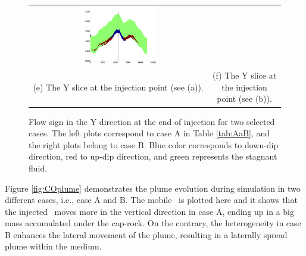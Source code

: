 \begin{figure}
\begin{tabular}{cc}
\includegraphics[width=0.45\textwidth]{./figurer/C03211_FlowSign_slcy}
\\(e) The Y slice at the injection point (see (a)).&
(f) The Y slice at the injection point (see (b)).
\end{tabular}
\caption{Flow sign in the Y direction at the end of injection for two selected cases. The left plots correspond to case A in Table \ref{tab:AaB}, and the right plots belong to case B. Blue color corresponds to down-dip direction, red to up-dip direction, and green represents the stagnant fluid.}
\label{fig:FOSEOI}
\end{figure}

Figure \ref{fig:COplume} demonstrates the plume evolution during simulation in two different cases, i.e., case A and B. The mobile \coo\ is plotted here and it shows that the injected \coo\ moves more in the vertical direction in case A, ending up in a big mass accumulated under the cap-rock. On the contrary, the heterogeneity in case B enhances the lateral movement of the plume, resulting in a laterally spread plume within the medium.

